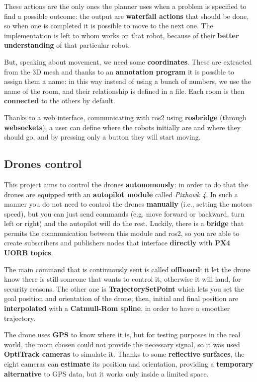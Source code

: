 \bigskip

These actions are the only ones the planner uses when a problem is specified to find a possible outcome: the output are \textbf{waterfall actions} that should be done, so when one is completed it is possible to move to the next one. The implementation is left to whom works on that robot, because of their \textbf{better understanding} of that particular robot.

But, speaking about movement, we need some \textbf{coordinates}. These are extracted from the 3D mesh and thanks to an \textbf{annotation program} it is possible to assign them a name: in this way instead of using a bunch of numbers, we use the name of the room, and their relationship is defined in a file. Each room is then \textbf{connected} to the others by default.

Thanks to a web interface, communicating with \acrshort{ros}2 using \textbf{rosbridge} (through \textbf{websockets}), a user can define where the robots initially are and where they should go, and by pressing only a button they will start moving.   

\subsection{Drones control}

This project aims to control the drones \textbf{autonomously}: in order to do that the drones are equipped with an \textbf{autopilot module} called \textit{Pixhawk 4}. In such a manner you do not need to control the drones \textbf{manually} (i.e., setting the motors speed), but you can just send commands (e.g. move forward or backward, turn left or right) and the autopilot will do the rest. Luckily, there is a \textbf{bridge} that permits the communication between this module and \acrshort{ros}2, so you are able to create subscribers and publishers nodes that interface \textbf{directly} with \textbf{PX4 UORB topics}\cite{px4}.

The main command that is continuously sent is called \textbf{offboard}: it let the drone know there is still someone that wants to control it, otherwise it will land, for security reasons. The other one is \textbf{TrajectorySetPoint} which lets you set the goal position and orientation of the drone; then, initial and final position are \textbf{interpolated} with a \textbf{Catmull-Rom spline}, in order to have a smoother trajectory.

The drone uses \textbf{GPS} to know where it is, but for testing purposes in the real world, the room chosen could not provide the necessary signal, so it was used \textbf{OptiTrack cameras} to simulate it. Thanks to some \textbf{reflective surfaces}, the eight cameras can \textbf{estimate} its position and orientation, providing a \textbf{temporary alternative} to GPS data, but it works only inside a limited space.

